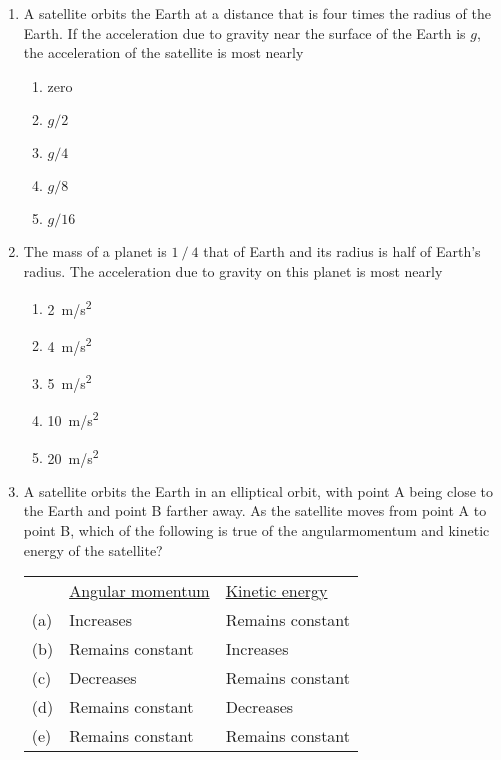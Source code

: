 \documentclass[12pt]{article}
\begin{document}
\begin{enumerate}[leftmargin=50pt,label=\underline{\hspace{0.4in}} \arabic*.]
\item A satellite orbits the Earth at a distance that is four times the radius
  of the Earth. If the acceleration due to gravity near the surface of the Earth
  is $g$, the acceleration of the satellite is most nearly
  \begin{enumerate}[noitemsep,topsep=0pt,leftmargin=18pt]
  \item zero
  \item $g/2$
  \item $g/4$
  \item $g/8$
  \item $g/16$
  \end{enumerate}

\item The mass of a planet is $1⁄4$ that of Earth and its radius is half of
  Earth's radius. The acceleration due to gravity on this planet is most nearly
  \begin{enumerate}[noitemsep,topsep=0pt,leftmargin=18pt]
  \item\SI{2 }{m/s^2}
  \item\SI{4 }{m/s^2}
  \item\SI{5 }{m/s^2}
  \item\SI{10}{m/s^2}
  \item\SI{20}{m/s^2}
  \end{enumerate}
  \begin{center}
    \vspace{-.25in}
  \end{center}
  
\item A satellite orbits the Earth in an elliptical orbit, with point A being
  close to the Earth and point B farther away. As the satellite moves from
  point A to point B, which of the following is true of the angularmomentum and
  kinetic energy of the satellite?
  
  \begin{tabular}{lll}
    & \underline{Angular momentum} & \underline{Kinetic energy}\\
    (a) & Increases & Remains constant \\
    (b) & Remains constant & Increases \\
    (c) & Decreases & Remains constant \\
    (d) & Remains constant & Decreases \\
    (e) & Remains constant & Remains constant
  \end{tabular}


\end{enumerate}
\end{document}
